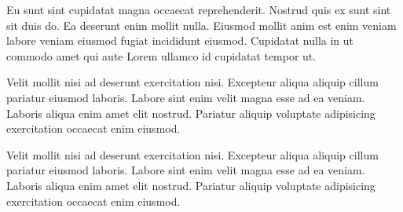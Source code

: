 \documentclass[12pt]{article} %
\begin{document}
\begin{spacing}{3}
    Eu sunt sint cupidatat magna occaecat reprehenderit. Nostrud quis ex sunt sint sit duis do. Ea deserunt enim mollit nulla. Eiusmod mollit anim est enim veniam labore veniam eiusmod fugiat incididunt eiusmod. Cupidatat nulla in ut commodo amet qui aute Lorem ullamco id cupidatat tempor ut.
\end{spacing}

\singlespacing

\hspace{2cm}Velit mollit nisi ad deserunt exercitation nisi. Excepteur aliqua aliquip cillum pariatur eiusmod laboris. Labore sint enim velit magna esse ad ea veniam. Laboris aliqua enim amet elit nostrud. Pariatur aliquip voluptate adipisicing exercitation occaecat enim eiusmod.

\vspace{2cm} %

Velit mollit nisi ad deserunt exercitation nisi. Excepteur aliqua aliquip cillum pariatur eiusmod laboris. Labore sint enim velit magna esse ad ea veniam. Laboris aliqua enim amet elit nostrud. Pariatur aliquip voluptate adipisicing exercitation occaecat enim eiusmod.
\end{document}
